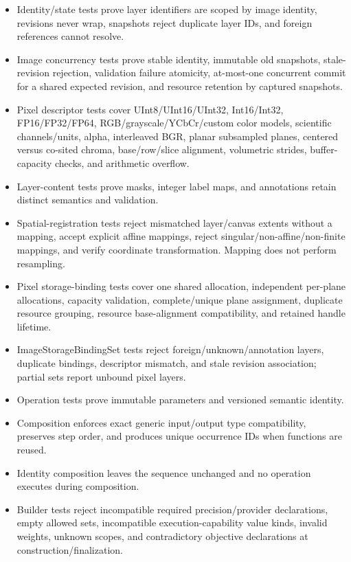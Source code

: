\exitcriteria
\begin{itemize}
  \item Identity/state tests prove layer identifiers are scoped by image identity, revisions never wrap, snapshots reject duplicate layer IDs, and foreign references cannot resolve.
  \item Image concurrency tests prove stable identity, immutable old snapshots, stale-revision rejection, validation failure atomicity, at-most-one concurrent commit for a shared expected revision, and resource retention by captured snapshots.
  \item Pixel descriptor tests cover UInt8/UInt16/UInt32, Int16/Int32, FP16/FP32/FP64, RGB/grayscale/YCbCr/custom color models, scientific channels/units, alpha, interleaved BGR, planar subsampled planes, centered versus co-sited chroma, base/row/slice alignment, volumetric strides, buffer-capacity checks, and arithmetic overflow.
  \item Layer-content tests prove masks, integer label maps, and annotations retain distinct semantics and validation.
  \item Spatial-registration tests reject mismatched layer/canvas extents without a mapping, accept explicit affine mappings, reject singular/non-affine/non-finite mappings, and verify coordinate transformation. Mapping does not perform resampling.
  \item Pixel storage-binding tests cover one shared allocation, independent per-plane allocations, capacity validation, complete/unique plane assignment, duplicate resource grouping, resource base-alignment compatibility, and retained handle lifetime.
  \item ImageStorageBindingSet tests reject foreign/unknown/annotation layers, duplicate bindings, descriptor mismatch, and stale revision association; partial sets report unbound pixel layers.
  \item Operation tests prove immutable parameters and versioned semantic identity.
  \item Composition enforces exact generic input/output type compatibility, preserves step order, and produces unique occurrence IDs when functions are reused.
  \item Identity composition leaves the sequence unchanged and no operation executes during composition.
  \item Builder tests reject incompatible required precision/provider declarations, empty allowed sets, incompatible execution-capability value kinds, invalid weights, unknown scopes, and contradictory objective declarations at construction/finalization.

\end{itemize}
